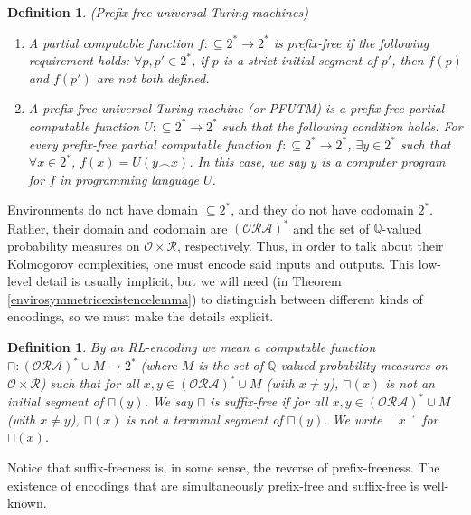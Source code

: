 \documentclass[runningheads]{llncs}
\newtheorem{mydefinition}[mytheorem]{Definition}
\begin{document}
\begin{mydefinition}
    (Prefix-free universal Turing machines)
    \begin{enumerate}
        \item A partial computable function $f:\subseteq 2^*\to 2^*$
        is \emph{prefix-free} if the following requirement holds:
        $\forall p,p'\in 2^*$, if $p$ is a strict initial segment of $p'$,
        then $f(p)$ and $f(p')$ are not both defined.
        \item A \emph{prefix-free universal Turing machine}
        (or \emph{PFUTM}) is a prefix-free
        partial computable function $U:\subseteq 2^*\to 2^*$
        such that the following condition holds.
        For every prefix-free partial computable function
        $f:\subseteq 2^*\to 2^*$, $\exists y\in 2^*$ such that
        $\forall x\in 2^*$, $f(x)=U(y\frown x)$.
        In this case, we say $y$ is a \emph{computer program for
        $f$ in programming language $U$}.
    \end{enumerate}
\end{mydefinition}

Environments do not have domain $\subseteq 2^*$, and they do not
have codomain $2^*$.
Rather, their domain and codomain are $(\mathcal O\mathcal R\mathcal A)^*$
and the set of $\mathbb Q$-valued probability measures on $\mathcal O\times\mathcal R$,
respectively.
Thus, in order to talk about their Kolmogorov complexities,
one must encode said inputs and outputs. This low-level detail is
usually implicit, but we will need (in Theorem \ref{envirosymmetricexistencelemma})
to distinguish between different kinds of encodings, so we must make the
details explicit.

\begin{mydefinition}
    By an \emph{RL-encoding} we mean a computable function
    $\sqcap:(\mathcal O\mathcal R\mathcal A)^*\cup M\to 2^*$
    (where $M$ is the set of $\mathbb Q$-valued probability-measures
    on $\mathcal O\times\mathcal R$) such that
    for all $x,y\in (\mathcal O\mathcal R\mathcal A)^*\cup M$ (with $x\not=y$),
    $\sqcap(x)$ is not an initial segment of $\sqcap(y)$.
    We say $\sqcap$ is
    \emph{suffix-free} if
    for all $x,y\in (\mathcal O\mathcal R\mathcal A)^*\cup M$ (with $x\not=y$),
    $\sqcap(x)$ is not a terminal segment of $\sqcap(y)$.
    We write $\ulcorner x\urcorner$ for $\sqcap(x)$.
\end{mydefinition}

Notice that suffix-freeness is, in some sense, the reverse of prefix-freeness.
The existence of encodings that are simultaneously prefix-free and suffix-free
is well-known.
\end{document}
